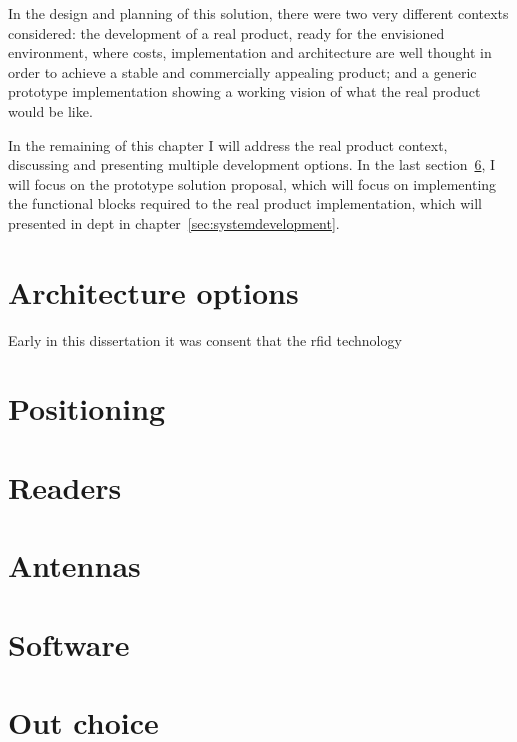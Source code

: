 In the design and planning of this solution, there were two very different contexts considered: the development of a real product, ready for the envisioned environment, where costs, implementation and architecture are well thought in order to achieve a stable and commercially appealing product; and a generic prototype implementation showing a working vision of what the real product would be like.

In the remaining of this chapter I will address the real product context, discussing and presenting multiple development options. In the last section~\ref{sec:ourchoice}, I will focus on the prototype solution proposal, which will focus on implementing the functional blocks required to the real product implementation, which will presented in dept in chapter~\ref{sec:systemdevelopment}.

\section{Architecture options}

Early in this dissertation it was consent that the \ac{rfid} technology 

\section{Positioning}

\section{Readers}

\section{Antennas}

\section{Software}

\section{Out choice} \label{sec:ourchoice}
